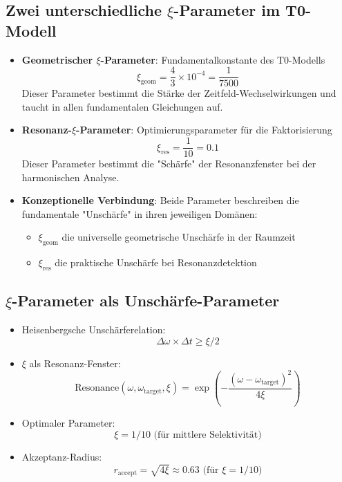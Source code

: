 \documentclass[12pt,a4paper]{article}
\begin{document}
	\subsection{Zwei unterschiedliche $\xi$-Parameter im T0-Modell}
	\begin{itemize}
		\item \textbf{Geometrischer $\xi$-Parameter}: Fundamentalkonstante des T0-Modells
		\begin{equation}
			\xi_{\text{geom}} = \frac{4}{3} \times 10^{-4} = \frac{1}{7500}
		\end{equation}
		Dieser Parameter bestimmt die Stärke der Zeitfeld-Wechselwirkungen und taucht in allen fundamentalen Gleichungen auf.
		
		\item \textbf{Resonanz-$\xi$-Parameter}: Optimierungsparameter für die Faktorisierung
		\begin{equation}
			\xi_{\text{res}} = \frac{1}{10} = 0.1
		\end{equation}
		Dieser Parameter bestimmt die "Schärfe" der Resonanzfenster bei der harmonischen Analyse.
		
		\item \textbf{Konzeptionelle Verbindung}: Beide Parameter beschreiben die fundamentale "Unschärfe" in ihren jeweiligen Domänen:
		\begin{itemize}
			\item $\xi_{\text{geom}}$ die universelle geometrische Unschärfe in der Raumzeit
			\item $\xi_{\text{res}}$ die praktische Unschärfe bei Resonanzdetektion
		\end{itemize}
	\end{itemize}
	
	\subsection{$\xi$-Parameter als Unschärfe-Parameter}
	\begin{itemize}
		\item Heisenbergsche Unschärferelation:
		\begin{equation}
			\Delta\omega \times \Delta t \geq \xi/2
		\end{equation}
		
		\item $\xi$ als Resonanz-Fenster:
		\begin{equation}
			\text{Resonance}(\omega, \omega_{\text{target}}, \xi) = \exp\left(-\frac{(\omega-\omega_{\text{target}})^2}{4\xi}\right)
		\end{equation}
		
		\item Optimaler Parameter:
		\begin{equation}
			\xi = 1/10 \text{ (für mittlere Selektivität)}
		\end{equation}
		
		\item Akzeptanz-Radius:
		\begin{equation}
			r_{\text{accept}} = \sqrt{4\xi} \approx 0.63 \text{ (für } \xi = 1/10)
		\end{equation}
	\end{itemize}
	
\end{document}
